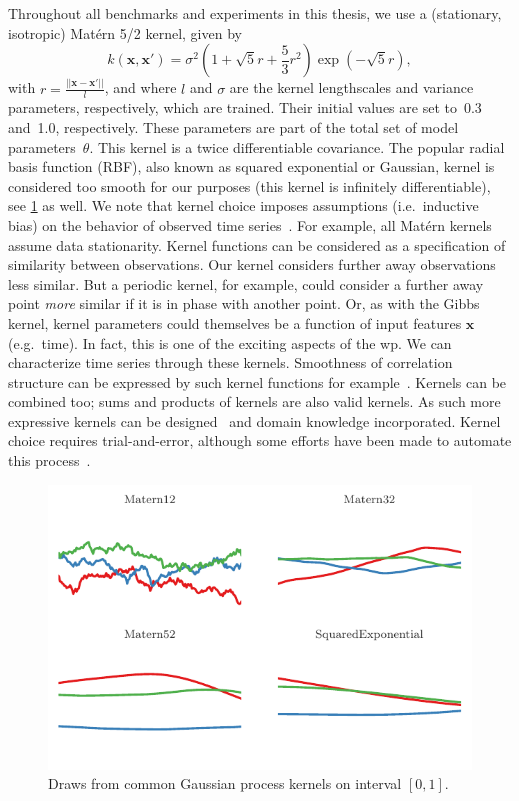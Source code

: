 Throughout all benchmarks and experiments in this thesis, we use a (stationary, isotropic) Matérn 5/2 kernel, given by
\begin{equation}
  \label{eq:matern}
  k(\textbf{x}, \textbf{x}') = \sigma^2 (1 + \sqrt{5} r + \frac53 r^2) \exp(-\sqrt{5}r),
\end{equation}
with $r = \frac{||\textbf{x} - \textbf{x}'||}{l}$, and where $l$ and $\sigma$ are the kernel lengthscales and variance parameters, respectively, which are trained.
Their initial values are set to~0.3 and~1.0, respectively.
These parameters are part of the total set of model parameters~$\theta$.
This kernel is a twice differentiable covariance.
The popular radial basis function (RBF), also known as squared exponential or Gaussian, kernel is considered too smooth for our purposes (this kernel is infinitely differentiable), see \cref{fig:kernel-draws} as well.
We note that kernel choice imposes assumptions (i.e.~inductive bias) on the behavior of observed time series~\parencite[see also][chapter 2]{Duvenaud2014}.
For example, all Matérn kernels assume data stationarity.
Kernel functions can be considered as a specification of similarity between observations.
Our kernel considers further away observations less similar.
But a periodic kernel, for example, could consider a further away point \emph{more} similar if it is in phase with another point.
Or, as with the Gibbs kernel, kernel parameters could themselves be a function of input features $\mathbf{x}$ (e.g.~time).
In fact, this is one of the exciting aspects of the \gls{wp}.
We can characterize time series through these kernels.
Smoothness of correlation structure can be expressed by such kernel functions for example~\parencite{Fyshe2012, Fox2015, Foti2019}.
Kernels can be combined too; sums and products of kernels are also valid kernels.
As such more expressive kernels can be designed~\parencite{Gonen2011} and domain knowledge incorporated.
Kernel choice requires trial-and-error, although some efforts have been made to automate this process~\parencite[see e.g.][]{Steinruecken2019}.


\begin{figure}[t]
  \centering
  \includegraphics[width=\textwidth]{fig/studies/kernels}
  \caption{
    Draws from common Gaussian process kernels on interval $\left[ {0,1} \right]$.
  }\label{fig:kernel-draws}
\end{figure}



